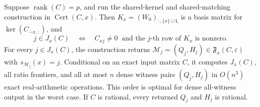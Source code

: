 Suppose \(\operatorname{rank}(C)=p\), and run the shared-kernel and shared-matching construction in \(\operatorname{Cert}(C,x)\). Then \(K_x=(W_0)_{:,\{x\}\cup\mathsf L}\) is a basis matrix for \(\ker(C_{-x,:})\), and
\[
 j\in J_x(C)
 \quad\Longleftrightarrow\quad
 C_{xj}\ne0\ \text{ and the \(j\)-th row of \(K_x\) is nonzero}.
\]
For every \(j\in J_x(C)\), the construction returns \(\mathcal M_j=(Q_j,H_j)\in\mathfrak F_x(C,\varepsilon)\) with \(s_{\mathcal M_j}(x)=j\). Conditional on an exact input matrix \(C\), it computes \(J_x(C)\), all ratio frontiers, and all at most \(n\) dense witness pairs \((Q_j,H_j)\) in \(O(n^3)\) exact real-arithmetic operations. This order is optimal for dense all-witness output in the worst case. If \(C\) is rational, every returned \(Q_j\) and \(H_j\) is rational.